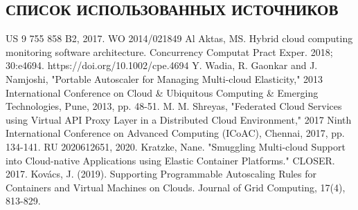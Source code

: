 \begin{center}
\section*{СПИСОК ИСПОЛЬЗОВАННЫХ ИСТОЧНИКОВ}
\end{center}
\begingroup
\renewcommand{\section}[2]{}%
\begin{thebibliography}{99}
US 9 755 858 B2, 2017.
WO 2014/021849 Al
Aktas, MS. Hybrid cloud computing monitoring software architecture. Concurrency Computat Pract Exper. 2018; 30:e4694. https://doi.org/10.1002/cpe.4694
Y. Wadia, R. Gaonkar and J. Namjoshi, "Portable Autoscaler for Managing Multi-cloud Elasticity," 2013 International Conference on Cloud \& Ubiquitous Computing \& Emerging Technologies, Pune, 2013, pp. 48-51.
M. M. Shreyas, "Federated Cloud Services using Virtual API Proxy Layer in a Distributed Cloud Environment," 2017 Ninth International Conference on Advanced Computing (ICoAC), Chennai, 2017, pp. 134-141.
RU 2020612651, 2020.
Kratzke, Nane. "Smuggling Multi-cloud Support into Cloud-native Applications using Elastic Container Platforms." CLOSER. 2017.
Kovács, J. (2019). Supporting Programmable Autoscaling Rules for Containers and Virtual Machines on Clouds. Journal of Grid Computing, 17(4), 813-829.
\end{thebibliography}
\endgroup